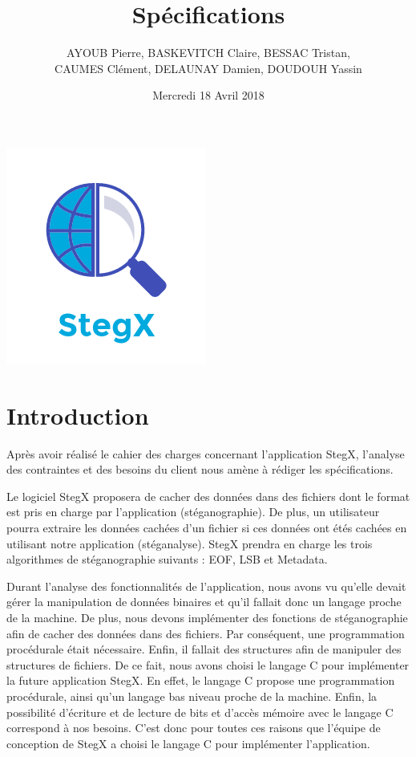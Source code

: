 \documentclass[11pt]{article}
\title{\huge{\textbf Spécifications}}
\author{AYOUB Pierre, BASKEVITCH Claire, BESSAC Tristan, \\
CAUMES Clément, DELAUNAY Damien, DOUDOUH Yassin}
\date{Mercredi 18 Avril 2018}
\begin{document}
\maketitle
\vspace{20em}
\begin{center}\includegraphics{pictures/Application.png}\end{center}
\newpage

\tableofcontents

\newpage

\section{Introduction}

Après avoir réalisé le cahier des charges concernant l'application StegX, 
l'analyse des contraintes et des besoins du client nous amène à rédiger 
les spécifications. 

Le logiciel StegX proposera de cacher des données dans des fichiers dont le
format est pris en charge par l'application (stéganographie). De plus, un
utilisateur pourra extraire les données cachées d'un fichier si ces données ont
étés cachées en utilisant notre application (stéganalyse). StegX prendra en
charge les trois algorithmes de stéganographie suivants : EOF, LSB et Metadata.

Durant l'analyse des fonctionnalités de l'application, nous avons vu qu'elle
devait gérer la manipulation de données binaires et qu’il fallait donc un
langage proche de la machine. De plus, nous devons implémenter des fonctions de
stéganographie afin de cacher des données dans des fichiers. Par conséquent, une
programmation procédurale était nécessaire. Enfin, il fallait des structures
afin de manipuler des structures de fichiers. De ce fait, nous avons choisi le
langage C pour implémenter la future application StegX. En effet, le langage C
propose une programmation procédurale, ainsi qu'un langage bas niveau proche de
la machine. Enfin, la possibilité d'écriture et de lecture de bits et d'accès
mémoire avec le langage C correspond à nos besoins. C'est donc pour toutes ces
raisons que l'équipe de conception de StegX a choisi le langage C pour
implémenter l'application. 
\end{document}
